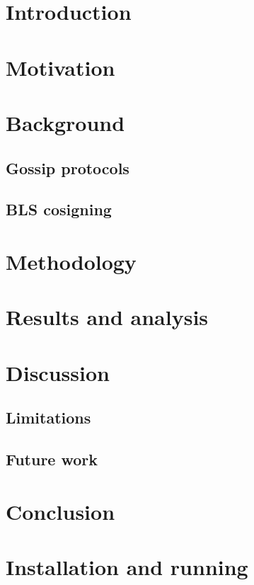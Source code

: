 \section{Introduction}


\section{Motivation}


\section{Background}

\subsection{Gossip protocols}

\subsection{BLS cosigning}


\section{Methodology}


\section{Results and analysis}


\section{Discussion}

\subsection{Limitations}

\subsection{Future work}


\section{Conclusion}


\appendix

\section{Installation and running}
